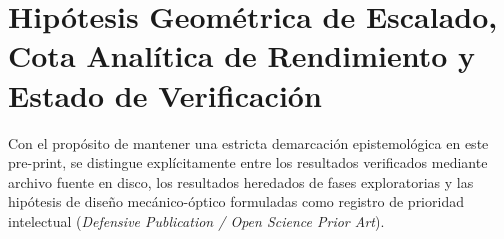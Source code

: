 \documentclass[10pt,twocolumn,a4paper]{article}
\begin{document}
\section{Hipótesis Geométrica de Escalado, Cota Analítica de Rendimiento y Estado de Verificación}

Con el propósito de mantener una estricta demarcación epistemológica en este pre-print, se distingue explícitamente entre los resultados verificados mediante archivo fuente en disco, los resultados heredados de fases exploratorias y las hipótesis de diseño mecánico-óptico formuladas como registro de prioridad intelectual (\textit{Defensive Publication / Open Science Prior Art}).
\end{document}
